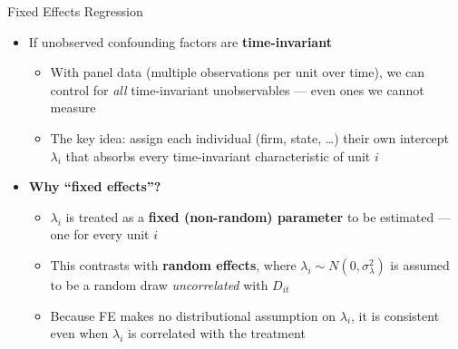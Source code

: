 \documentclass[dvipsnames,hyperref={pdfpagelabels=false}]{beamer}
\begin{document}





\date
{}


\begin{frame}{}
	\titlepage
\end{frame}



\begin{frame}{Fixed Effects Regression}
	\begin{itemize}

		\item If unobserved confounding factors are \textbf{time-invariant}
		\vspace{0.2cm}
		\begin{itemize}
			\item With panel data (multiple observations per unit over time), we can control for \textit{all} time-invariant unobservables — even ones we cannot measure
			\vspace{0.2cm}
			\item The key idea: assign each individual (firm, state, \ldots) their own intercept $\lambda_i$ that absorbs every time-invariant characteristic of unit $i$
		\end{itemize}

		\vspace{0.2cm}
		\item \textbf{Why ``fixed effects''?}
		\vspace{0.2cm}
		\begin{itemize}
			\item $\lambda_i$ is treated as a \textbf{fixed (non-random) parameter} to be estimated — one for every unit $i$
			\vspace{0.2cm}
			\item This contrasts with \textbf{random effects}, where $\lambda_i \sim N(0,\sigma^2_\lambda)$ is assumed to be a random draw \textit{uncorrelated} with $D_{it}$
			\vspace{0.2cm}
			\item Because FE makes no distributional assumption on $\lambda_i$, it is consistent even when $\lambda_i$ is correlated with the treatment
		\end{itemize}

	\end{itemize}
\end{frame}
\end{document}
